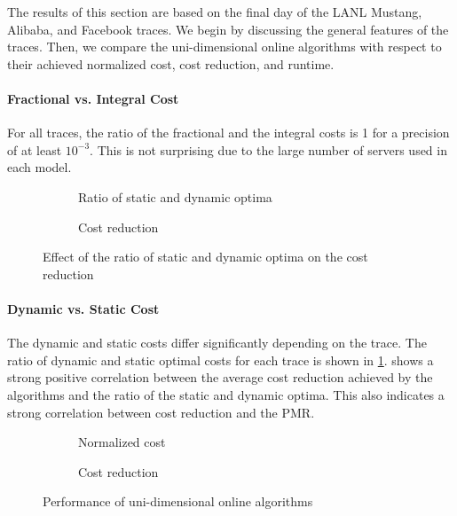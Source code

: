 The results of this section are based on the final day of the LANL Mustang, Alibaba, and Facebook traces. We begin by discussing the general features of the traces. Then, we compare the uni-dimensional online algorithms with respect to their achieved normalized cost, cost reduction, and runtime.

\paragraph{Fractional vs. Integral Cost} For all traces, the ratio of the fractional and the integral costs is 1 for a precision of at least $10^{-3}$. This is not surprising due to the large number of servers used in each model.

\begin{figure}
    \begin{subfigure}[b]{.5\linewidth}
    \resizebox{\textwidth}{!}{}
    \caption{Ratio of static and dynamic optima}\label{fig:case_studies:ud:opt_vs_opts}
    \end{subfigure}
    \begin{subfigure}[b]{.5\linewidth}
    \resizebox{\textwidth}{!}{}
    \caption{Cost reduction}\label{fig:case_studies:ud:opt_vs_opts_against_mean_cost_reduction}
    \end{subfigure}
    \caption{Effect of the ratio of static and dynamic optima on the cost reduction}
\end{figure}

\paragraph{Dynamic vs. Static Cost} The dynamic and static costs differ significantly depending on the trace. The ratio of dynamic and static optimal costs for each trace is shown in \cref{fig:case_studies:ud:opt_vs_opts}.  shows a strong positive correlation between the average cost reduction achieved by the algorithms and the ratio of the static and dynamic optima. This also indicates a strong correlation between cost reduction and the PMR.

\begin{figure}
    \begin{subfigure}[b]{.5\linewidth}
    \resizebox{\textwidth}{!}{}
    \caption{Normalized cost}\label{fig:case_studies:ud:normalized_cost}
    \end{subfigure}
    \begin{subfigure}[b]{.5\linewidth}
    \resizebox{\textwidth}{!}{}
    \caption{Cost reduction}\label{fig:case_studies:ud:cost_reduction}
    \end{subfigure}
    \caption{Performance of uni-dimensional online algorithms}
\end{figure}

